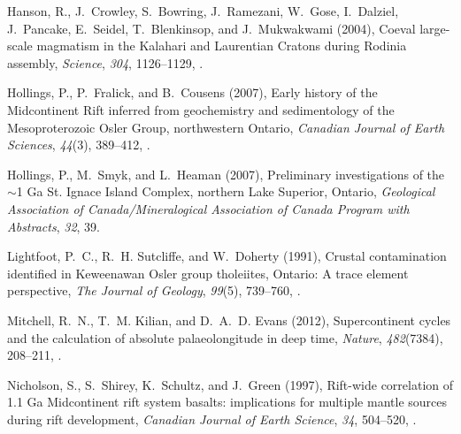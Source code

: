 \documentclass[draft,gc]{AGUTeX}
\begin{document}
\begin{article}
\begin{thebibliography}{24}
Hanson, R., J.~Crowley, S.~Bowring, J.~Ramezani, W.~Gose, I.~Dalziel,
  J.~Pancake, E.~Seidel, T.~Blenkinsop, and J.~Mukwakwami (2004), Coeval
  large-scale magmatism in the {K}alahari and {L}aurentian {C}ratons during
  {R}odinia assembly, \textit{Science}, \textit{304}, 1126--1129,
  .

Hollings, P., P.~Fralick, and B.~Cousens (2007{}), {Early history
  of the Midcontinent Rift inferred from geochemistry and sedimentology of the
  Mesoproterozoic Osler Group, northwestern Ontario}, \textit{Canadian Journal
  of Earth Sciences}, \textit{44}(3), 389--412, .

Hollings, P., M.~Smyk, and L.~Heaman (2007{}), Preliminary
  investigations of the $\sim$1 {Ga St. Ignace Island Complex, northern Lake
  Superior, Ontario}, \textit{Geological Association of Canada/Mineralogical
  Association of Canada Program with Abstracts}, \textit{32}, 39.

Lightfoot, P.~C., R.~H. Sutcliffe, and W.~Doherty (1991), Crustal contamination
  identified in {K}eweenawan {O}sler group tholeiites, {O}ntario: A trace
  element perspective, \textit{The Journal of Geology}, \textit{99}(5),
  739--760, .

Mitchell, R.~N., T.~M. Kilian, and D.~A.~D. Evans (2012), Supercontinent cycles
  and the calculation of absolute palaeolongitude in deep time,
  \textit{Nature}, \textit{482}(7384), 208--211, .

Nicholson, S., S.~Shirey, K.~Schultz, and J.~Green (1997), Rift-wide
  correlation of 1.1 {G}a {M}idcontinent rift system basalts: implications for
  multiple mantle sources during rift development, \textit{Canadian Journal of
  Earth Science}, \textit{34}, 504--520, .


\end{thebibliography}
\end{article}
\end{document}

